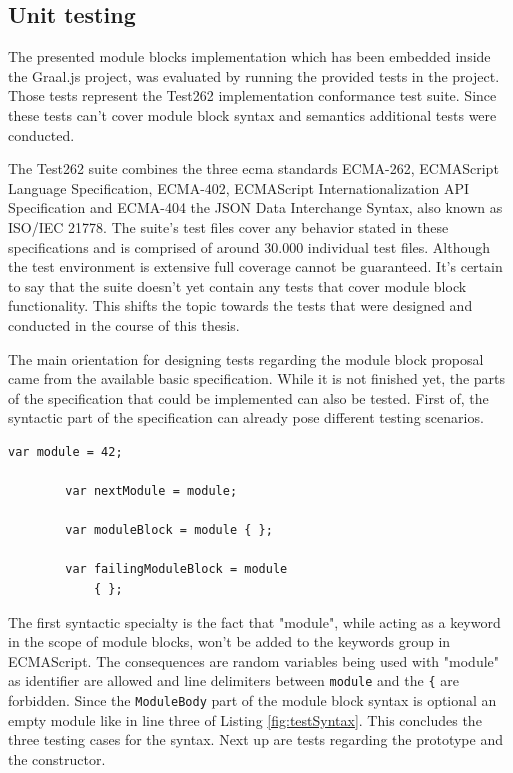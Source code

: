 \subsection{Unit testing}

The presented module blocks implementation which has been embedded inside the Graal.js project, was evaluated by running the provided tests in the project. Those tests represent the Test262 implementation conformance test suite. \cite{ecmaTest262} Since these tests can't cover module block syntax and semantics additional tests were conducted.

The Test262 suite combines the three ecma standards ECMA-262, ECMAScript Language Specification, ECMA-402, ECMAScript Internationalization API Specification and ECMA-404 the JSON Data Interchange Syntax, also known as ISO/IEC 21778. The suite's test files cover any  behavior stated in these specifications and is comprised of around 30.000 individual test files. \cite{ecmaTest262, ecmaTestSpec} Although the test environment is extensive full coverage cannot be guaranteed. It's certain to say that the suite doesn't yet contain any tests that cover module block functionality. This shifts the topic towards the tests that were designed and conducted in the course of this thesis.

The main orientation for designing tests regarding the module block proposal came from the available basic specification. While it is not finished yet, the parts of the specification that could be implemented can also be tested. First of, the syntactic part of the specification can already pose different testing scenarios.

    \begin{lstlisting}[caption={Module block syntax tests}, label={fig:testSyntax}]
        var module = 42;
        
        var nextModule = module;
        
        var moduleBlock = module { };
        
        var failingModuleBlock = module
            { };
    \end{lstlisting}

The first syntactic specialty is the fact that "module", while acting as a keyword in the scope of module blocks, won't be added to the keywords group in ECMAScript. The consequences are random variables being used with "module" as identifier are allowed and line delimiters between \texttt{module} and the \texttt{\{} are forbidden. Since the \texttt{ModuleBody} part of the module block syntax  is optional an empty module like in line three of Listing \ref{fig:testSyntax}. This concludes the three testing cases for the syntax. Next up are tests regarding the prototype and the constructor.

